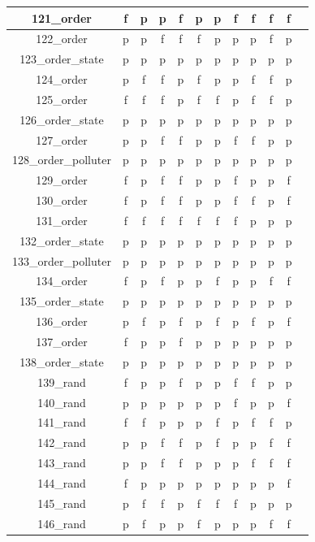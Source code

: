 \documentclass[
fancyheadings, %
%
%
]{stsreprt}
\begin{document}
\begin{longtable}{|c|c|c|c|c|c|c|c|c|c|c|c|}
\hline
121\_order & f & p & p & f & p & p & f & f & f & f \\
\hline
122\_order & p & p & f & f & f & p & p & p & f & p \\
\hline
123\_order\_state & p & p & p & p & p & p & p & p & p & p \\
\hline
124\_order & p & f & f & p & f & p & p & f & f & p \\
\hline
125\_order & f & f & f & p & f & f & p & f & f & p \\
\hline
126\_order\_state & p & p & p & p & p & p & p & p & p & p \\
\hline
127\_order & p & p & f & f & p & p & f & f & p & p \\
\hline
128\_order\_polluter & p & p & p & p & p & p & p & p & p & p \\
\hline
129\_order & f & p & f & f & p & p & f & p & p & f \\
\hline
130\_order & f & p & f & f & p & p & f & f & p & f \\
\hline
131\_order & f & f & f & f & f & f & f & p & p & p \\
\hline
132\_order\_state & p & p & p & p & p & p & p & p & p & p \\
\hline
133\_order\_polluter & p & p & p & p & p & p & p & p & p & p \\
\hline
134\_order & f & p & f & p & p & f & p & p & f & f \\
\hline
135\_order\_state & p & p & p & p & p & p & p & p & p & p \\
\hline
136\_order & p & f & p & f & p & f & p & f & p & f \\
\hline
137\_order & f & p & p & f & p & p & p & p & p & p \\
\hline
138\_order\_state & p & p & p & p & p & p & p & p & p & p \\
\hline
139\_rand & f & p & p & f & p & p & f & f & p & p \\
\hline
140\_rand & p & p & p & p & p & p & f & p & p & f \\
\hline
141\_rand & f & f & p & p & p & f & p & f & f & p \\
\hline
142\_rand & p & p & f & f & p & f & p & p & f & f \\
\hline
143\_rand & p & p & f & f & p & p & p & f & f & f \\
\hline
144\_rand & f & p & p & p & p & p & p & p & p & f \\
\hline
145\_rand & p & f & f & p & f & f & f & p & p & p \\
\hline
146\_rand & p & f & p & p & f & p & p & p & f & f \\

\end{longtable}
\end{document}
